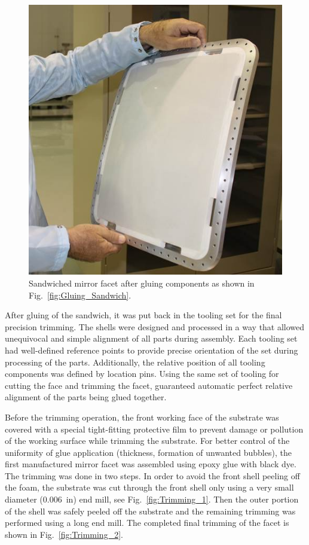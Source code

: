 \begin{figure}[ht]
    \centering
    \includegraphics[width=0.9\linewidth]{images/Assembled_Sandwich.jpg}
    \caption{Sandwiched mirror facet after gluing components as shown in Fig.~\ref{fig:Gluing_Sandwich}.}
    \label{fig:Assembled_Sandwich}
\end{figure}

After gluing of the sandwich, it was put back in the tooling set for the final precision trimming. The shells were
designed and processed in a way that allowed unequivocal and simple alignment of all parts during assembly. Each
tooling set had well-defined reference points to provide precise orientation of the set during processing of the
parts. Additionally, the relative position of all tooling components was defined by location pins. Using the same
set of tooling for cutting the face and trimming the facet, guaranteed automatic perfect relative alignment of
the parts being glued together.

Before the trimming operation, the front working face of the substrate was covered with a special tight-fitting
protective film to prevent damage or pollution of the working surface while trimming the substrate. For better
control of the uniformity of glue application (thickness, formation of unwanted bubbles), the first manufactured
mirror facet was assembled using epoxy glue with black dye. The trimming was done in two steps. In order to
avoid the front shell peeling off the foam, the substrate  was cut through the front shell only using a very small
diameter (0.006~in) end mill, see Fig.~\ref{fig:Trimming_1}. Then the outer portion of the shell was safely
peeled off the substrate and the remaining trimming was performed using a long end mill. The completed final
trimming of the facet is shown in Fig.~\ref{fig:Trimming_2}.

